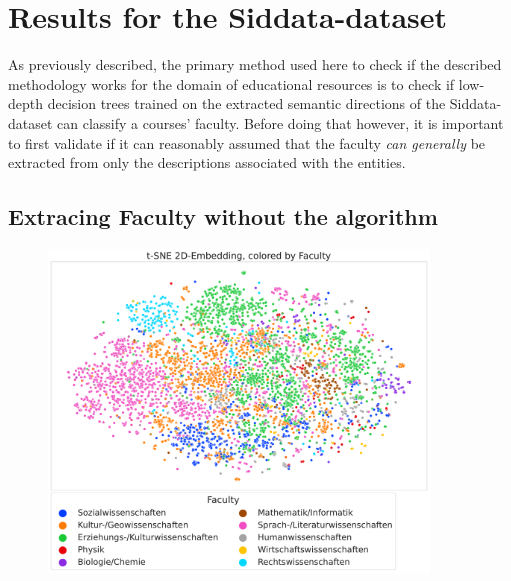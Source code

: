 
\section{Results for the Siddata-dataset}
\label{sec:results_siddata}


As previously described, the primary method used here to check if the described methodology works for the domain of educational resources is to check if low-depth decision trees trained on the extracted semantic directions of the Siddata-dataset can classify a courses' faculty. Before doing that however, it is important to first validate if it can reasonably assumed that the faculty \textit{can generally} be extracted from only the descriptions associated with the entities.

\subsection*{Extracing Faculty without the algorithm}

\begin{figure}[h]
	\begin{center}
	  \includegraphics[width=0.9\textwidth]{graphics/dataset_new/scatter_mds_tsne_e2a70a9bf2.pdf}
	  \label{fig:scatter_mds_siddata}
	\end{center}
\end{figure}

